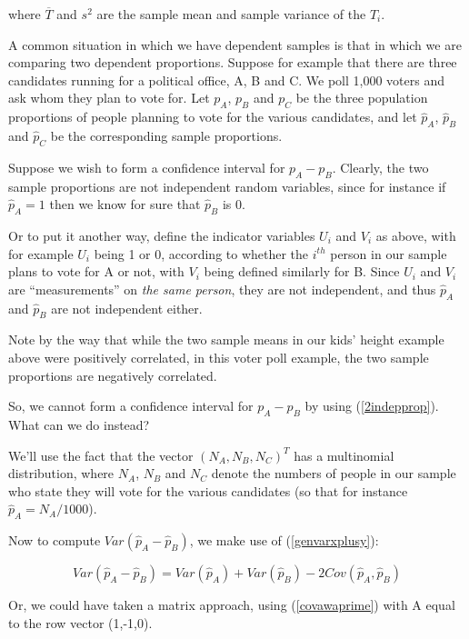 where $\overline{T}$ and $s^2$ are the sample mean and sample variance
of the $T_i$.

A common situation in which we have dependent samples is that in which
we are comparing two dependent proportions.  Suppose for example that
there are three candidates running for a political office, A, B and C.
We poll 1,000 voters and ask whom they plan to vote for.  Let $p_A$,
$p_B$ and $p_C$ be the three population proportions of people planning
to vote for the various candidates, and let $\widehat{p}_A$,
$\widehat{p}_B$ and $\widehat{p}_C$ be the corresponding sample
proportions.  

Suppose we wish to form a confidence interval for $p_A - p_B$. Clearly,
the two sample proportions are not independent random variables, since
for instance if $\widehat{p}_A = 1$ then we know for sure that
$\widehat{p}_B$ is 0.  

Or to put it another way, define the indicator variables $U_i$ and $V_i$
as above, with for example $U_i$ being 1 or 0, according to whether the
$i^{th}$ person in our sample plans to vote for A or not, with $V_i$
being defined similarly for B.  Since $U_i$ and $V_i$ are
``measurements'' on {\it the same person}, they are not independent, and
thus $\widehat{p}_A$ and $\widehat{p}_B$ are not independent either.

Note by the way that while the two sample means in our kids' height
example above were positively correlated, in this voter poll example,
the two sample proportions are negatively correlated.

So, we cannot form a confidence interval for $p_A - p_B$ by using
(\ref{2indepprop}).  What can we do instead?

We'll use the fact that the vector $(N_A, N_B, N_C)^T$ has a multinomial
distribution, where $N_A$, $N_B$ and $N_C$ denote the numbers of people
in our sample who state they will vote for the various candidates (so
that for instance $\widehat{p}_A = N_A/1000$).  

Now to compute $Var(\widehat{p}_A - \widehat{p}_B)$, we make use of
(\ref{genvarxplusy}):

\begin{equation}
Var(\widehat{p}_A - \widehat{p}_B) =
Var(\widehat{p}_A) + 
Var(\widehat{p}_B) - 
2Cov(\widehat{p}_A, \widehat{p}_B)
\end{equation}

Or, we could have taken a matrix approach, using (\ref{covawaprime})
with A equal to the row vector (1,-1,0).

